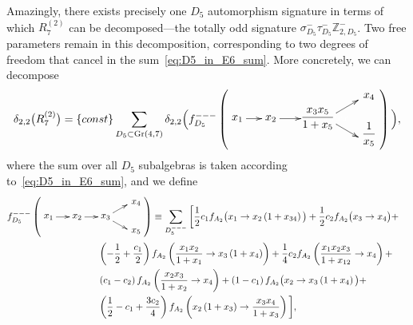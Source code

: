 \documentclass[11pt]{article}
\DeclareMathOperator{\Gr}{Gr}
\def\nl{\nonumber\\}
\begin{document}
Amazingly, there exists precisely one $D_5$ automorphism signature in terms of which $R_7^{(2)}$ can be decomposed---the totally odd signature $\sigma_{D_5}^- \tau_{D_5}^- \mathbb{Z}_{2,D_5}^-$. Two free parameters remain in this decomposition, corresponding to two degrees of freedom that cancel in the sum~\eqref{eq:D5_in_E6_sum}. More concretely, we can decompose 
\begin{align}
\delta_{2,2}\big(R^{(2)}_7 \big) = \{const\} \sum_{D_5\subset \Gr(4,7)} \delta_{2,2} \Big( f_{D_5}^{---}\left(
\begin{gathered}
    \begin{xy} 0;<1pt,0pt>:<0pt,-1pt>::
      (0,20) *+{x_1} ="1",
      (30,20) *+{x_2} ="2",
      (80,20) *+{\color{white} xxxxxxx} ="3",
      (114,0) *+{\color{white} x} ="4",
      (114,40) *+{\color{white} x} ="5",
      (72,20) *+{\begin{aligned} \frac{x_3 x_5}{1+x_5} \end{aligned}} ="6",
      (118,0) *+{x_4} ="7",
      (118,34) *+{\begin{aligned} \frac{1}{x_5}\end{aligned}} ="8",
      "1", {\ar"2"},
      "2", {\ar"3"},
      "3", {\ar"4"},
      "3", {\ar"5"},
    \end{xy}
\end{gathered}
\right) \Big), \label{eq:R27_D5_decomposition}
\end{align}
where the sum over all $D_5$ subalgebras is taken according to~\eqref{eq:D5_in_E6_sum}, and we define
\begin{align}\label{eq:fd5-init}
f_{D_5}^{---}\left(
\begin{gathered}
    \begin{xy} 0;<1pt,0pt>:<0pt,-1pt>::
      (0,15) *+{x_1} ="1",
      (30,15) *+{x_2} ="2",
      (60,15) *+{x_3} ="3",
      (90,-2) *+{\color{white} x_i} ="4",
      (90,32) *+{\color{white} x_i} ="5",
      (92,0) *+{x_4} ="6",
      (92,30) *+{x_5} ="7",
      "1", {\ar"2"},
      "2", {\ar"3"},
      "3", {\ar"4"},
      "3", {\ar"5"},
    \end{xy}
    \end{gathered} 
\right) &\equiv \sum_{D_5^{---}} \bigg[
	\frac{1}{2} c_1 f_{A_2}\big(x_1\to x_2 \left(1+x_{34}\right)\big)+
	\frac{1}{2} c_2 f_{A_2}\big(x_3\to x_4\big)+\nl
	&\hspace{-2cm} \left(-\frac{1}{2}+\frac{c_1}{2}\right) f_{A_2}\left(\frac{x_1 x_2}{1+x_1}\to x_3 \left(1+x_4\right)\right)+
	\frac{1}{4} c_2 f_{A_2}\left(\frac{x_1 x_2 x_3}{1+x_{12}}\to x_4\right)+\nl
	&\hspace{-2cm} \left(c_1-c_2\right) f_{A_2}\left(\frac{x_2 x_3}{1+x_2}\to x_4\right)+
	\left(1-c_1\right) f_{A_2}\big(x_2\to x_3 \left(1+x_4\right)\big)+\nl
	&\hspace{-2cm} \left(\frac{1}{2}-c_1+\frac{3 c_2}{4}\right) f_{A_2}\left(x_2 \left(1+x_3\right)\to \frac{x_3 x_4}{1+x_3}\right) \bigg],
\end{align}
\end{document}
